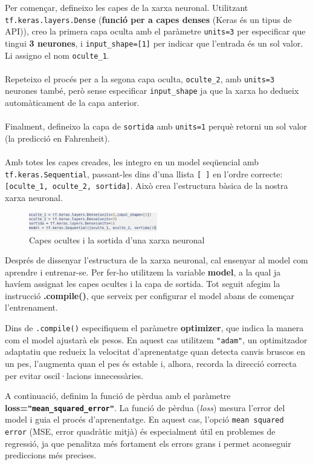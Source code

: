 Per començar, defineixo les capes de la xarxa neuronal. Utilitzant \texttt{tf.keras.layers.Dense} (\textbf{funció per a capes denses} (Keras és un tipus de API)), creo la primera capa oculta amb el paràmetre \texttt{units=3} per especificar que tingui \textbf{3 neurones}, i \texttt{input\_shape=[1]} per indicar que l'entrada és un sol valor. Li assigno el nom \texttt{oculte\_1}.\\ \\
Repeteixo el procés per a la segona capa oculta, \texttt{oculte\_2}, amb \texttt{units=3} neurones també, però sense especificar \texttt{input\_shape} ja que la xarxa ho dedueix automàticament de la capa anterior.\\ \\
Finalment, defineixo la capa de \texttt{sortida} amb \texttt{units=1} perquè retorni un sol valor (la predicció en Fahrenheit).\\ \\
Amb totes les capes creades, les integro en un model seqüencial amb \texttt{tf.keras.Sequential}, passant-les dins d'una llista \texttt{[ ]} en l'ordre correcte: \texttt{[oculte\_1, oculte\_2, sortida]}. Això crea l'estructura bàsica de la nostra xarxa neuronal.


\begin{figure}[H]
    \centering
    \includegraphics[width=0.5\textwidth]{./figures/3.png}
    \caption{Capes ocultes i la sortida d'una xarxa neuronal}
\end{figure}


Després de dissenyar l’estructura de la xarxa neuronal, cal ensenyar al model com aprendre i entrenar-se.
Per fer-ho utilitzem la variable \textbf{model}, a la qual ja havíem assignat les capes ocultes i la capa de sortida.
Tot seguit afegim la instrucció \textbf{.compile()}, que serveix per configurar el model abans de començar l’entrenament.

Dins de \texttt{.compile()} especifiquem el paràmetre \textbf{optimizer}, que indica la manera com el model ajustarà els pesos.
En aquest cas utilitzem \texttt{"adam"}, un optimitzador adaptatiu que redueix la velocitat d’aprenentatge quan detecta canvis bruscos en un pes,
l’augmenta quan el pes és estable i, alhora, recorda la direcció correcta per evitar oscil·lacions innecessàries.

A continuació, definim la funció de pèrdua amb el paràmetre \textbf{loss=\texttt{"mean\_squared\_error"}}.
La funció de pèrdua (\textit{loss}) mesura l’error del model i guia el procés d’aprenentatge.
En aquest cas, l’opció \texttt{mean squared error} (MSE, error quadràtic mitjà) és especialment útil en problemes de regressió,
ja que penalitza més fortament els errors grans i permet aconseguir prediccions més precises.


